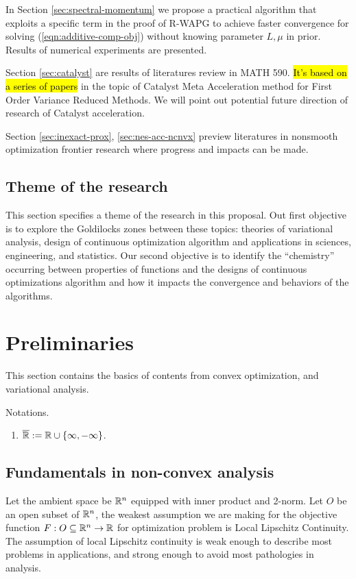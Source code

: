 \documentclass[12pt]{article}
\begin{document}
    In Section \ref{sec:spectral-momentum} we propose a practical algorithm that exploits a specific term in the proof of R-WAPG to achieve faster convergence for solving (\ref{eqn:additive-comp-obj}) without knowing parameter $L, \mu$ in prior. 
    Results of numerical experiments are presented. 
    \par
    Section \ref{sec:catalyst} are results of literatures review in MATH 590. 
    {\hl{It's based on a series of papers}} in the topic of Catalyst Meta Acceleration method for First Order Variance Reduced Methods. 
    We will point out potential future direction of research of Catalyst acceleration. 
    \par
    Section \ref{sec:inexact-prox}, \ref{sec:nes-acc-ncnvx} preview literatures in nonsmooth optimization frontier research where progress and impacts can be made.  
    \subsection{Theme of the research}
        This section specifies a theme of the research in this proposal. 
        Out first objective is to explore the Goldilocks zones between these topics: theories of variational analysis, design of continuous optimization algorithm and applications in sciences, engineering, and statistics.  
        Our second objective is to identify the ``chemistry'' occurring between properties of functions and the designs of continuous optimizations algorithm and how it impacts the convergence and behaviors of the algorithms. 


    
\section{Preliminaries}
    This section contains the basics of contents from convex optimization, and variational analysis. 
    \par
    Notations. 
    \begin{enumerate}
        \item $\overline {\mathbb R} := \mathbb R \cup \{\infty, -\infty\}$. 
    \end{enumerate}
    \subsection{Fundamentals in non-convex analysis}
        Let the ambient space be $\mathbb R^n$ equipped with inner product and 2-norm. 
        Let $O$ be an open subset of $\mathbb R^n$, the weakest assumption we are making for the objective function $F: O \subseteq \mathbb R^n \rightarrow \mathbb R$ for optimization problem is Local Lipschitz Continuity. 
        The assumption of local Lipschitz continuity is weak enough to describe most problems in applications, and strong enough to avoid most pathologies in analysis. 
\end{document}
